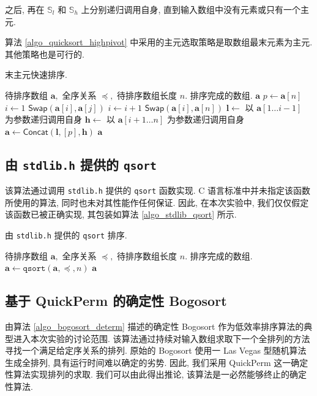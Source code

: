 \documentclass[12pt]{article}
\begin{document}
之后, 再在 $\mathbb{S}_l$ 和 $\mathbb{S}_h$ 上分别递归调用自身, 直到输入数组中没有元素或只有一个主元.

算法 \ref{algo_quicksort_highpivot} 中采用的主元选取策略是取数组最末元素为主元. 其他策略也是可行的.

\begin{algorithm}[H]
\caption{末主元快速排序.}
\label{algo_quicksort_highpivot}
\begin{algorithmic}[1]
\Require 待排序数组 $\bm{a},$ 全序关系 $\preceq,$ 待排序数组长度 $n.$
\Ensure 排序完成的数组.
    \State \Return $\bm{a}$
\EndIf
\State $p \gets \bm{a}[n]$
\State $i \gets 1$
        \State $\mathsf{Swap}(\bm{a}[i], \bm{a}[j])$
        \State $i \gets i + 1$
    \EndIf
\EndFor
\State $\mathsf{Swap}(\bm{a}[i], \bm{a}[n])$
\State $\bm{l} \gets$ 以 $\bm{a}[1 \dots i-1]$ 为参数递归调用自身
\State $\bm{h} \gets$ 以 $\bm{a}[i+1 \dots n]$ 为参数递归调用自身
\State $\bm{a} \gets \mathsf{Concat}(\bm{l}, [p], \bm{h})$
\State \Return $\bm{a}$
\end{algorithmic}
\end{algorithm}

\subsection{由 \texttt{stdlib.h} 提供的 \texttt{qsort}}

该算法通过调用 \texttt{stdlib.h} 提供的 \texttt{qsort} 函数实现. C 语言标准中并未指定该函数所使用的算法, 同时也未对其性能作任何保证. 因此, 在本次实验中, 我们仅仅假定该函数已被正确实现, 其包装如算法 \ref{algo_stdlib_qsort} 所示.

\begin{algorithm}[H]
\caption{由 \texttt{stdlib.h} 提供的 \texttt{qsort} 排序.}
\label{algo_stdlib_qsort}
\begin{algorithmic}[1]
\Require 待排序数组 $\bm{a},$ 全序关系 $\preceq,$ 待排序数组长度 $n.$
\Ensure 排序完成的数组.
\State $\bm{a} \gets \mathtt{qsort}(\bm{a}, \preceq, n)$
\State \Return $\bm{a}$
\end{algorithmic}
\end{algorithm}

\subsection{基于 QuickPerm 的确定性 Bogosort}

由算法 \ref{algo_bogosort_determ} 描述的确定性 Bogosort 作为低效率排序算法的典型进入本次实验的讨论范围. 该算法通过持续对输入数组求取下一个全排列的方法寻找一个满足给定序关系的排列. 原始的 Bogosort 使用一 Las Vegas 型随机算法生成全排列, 具有运行时间难以确定的劣势. 因此, 我们采用 QuickPerm\cite{bib_quickperm} 这一确定性算法实现排列的求取. 我们可以由此得出推论, 该算法是一必然能够终止的确定性算法.
\end{document}

